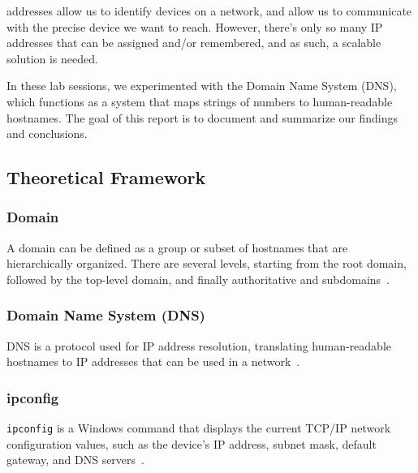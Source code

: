 % 
% 
% 
% 
 addresses allow us to identify devices on a network,
and allow us to communicate with the precise device we want to reach.
However, there's only so many IP addresses that can be assigned and/or remembered, and as such,
a scalable solution is needed.

In these lab sessions, we experimented with the Domain Name System (DNS), which
functions as a system that maps strings of numbers to human-readable hostnames.
The goal of this report is to document and summarize our findings and
conclusions.



\subsection{Theoretical Framework}
\subsubsection{Domain}
A domain can be defined as a group or subset of hostnames that are
hierarchically organized. There are several levels, starting from the root
domain, followed by the top-level domain, and finally authoritative and
subdomains~\cite{tanenbaum:networks}.

\subsubsection{Domain Name System (DNS)}
DNS is a protocol used for IP address resolution, translating human-readable
hostnames to IP addresses that can be used in a
network~\cite{tanenbaum:networks}.

\subsubsection{ipconfig}
\texttt{ipconfig} is a Windows command that displays
the current TCP/IP network configuration values, such as the device's IP address,
subnet mask, default gateway, and DNS servers~\cite{microsoft:ipconfig}.

